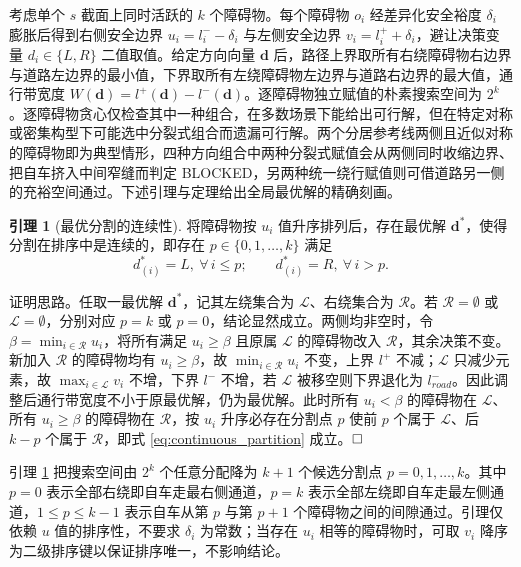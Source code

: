 \documentclass[a4paper,11pt]{ctexart}
\theoremstyle{definition}
\newtheorem{lemma}{引理}[section]
\begin{document}
考虑单个 $s$ 截面上同时活跃的 $k$ 个障碍物。每个障碍物 $o_i$ 经差异化安全裕度 $\delta_i$ 膨胀后得到右侧安全边界 $u_i = l_i^{-} - \delta_i$ 与左侧安全边界 $v_i = l_i^{+} + \delta_i$，避让决策变量 $d_i \in \{L, R\}$ 二值取值。给定方向向量 $\mathbf{d}$ 后，路径上界取所有右绕障碍物右边界与道路左边界的最小值，下界取所有左绕障碍物左边界与道路右边界的最大值，通行带宽度 $W(\mathbf{d}) = l^{+}(\mathbf{d}) - l^{-}(\mathbf{d})$。逐障碍物独立赋值的朴素搜索空间为 $2^k$。逐障碍物贪心仅检查其中一种组合，在多数场景下能给出可行解，但在特定对称或密集构型下可能选中分裂式组合而遗漏可行解。两个分居参考线两侧且近似对称的障碍物即为典型情形，四种方向组合中两种分裂式赋值会从两侧同时收缩边界、把自车挤入中间窄缝而判定 BLOCKED，另两种统一绕行赋值则可借道路另一侧的充裕空间通过。下述引理与定理给出全局最优解的精确刻画。

\begin{lemma}[最优分割的连续性]
\label{lem:continuous_partition}
将障碍物按 $u_i$ 值升序排列后，存在最优解 $\mathbf{d}^{*}$，使得分割在排序中是连续的，即存在 $p \in \{0, 1, \ldots, k\}$ 满足
\begin{equation}
    d_{(i)}^{*} = L,\ \forall\, i \leq p; \qquad d_{(i)}^{*} = R,\ \forall\, i > p.
    \label{eq:continuous_partition}
\end{equation}
\end{lemma}

证明思路。任取一最优解 $\mathbf{d}^{*}$，记其左绕集合为 $\mathcal{L}$、右绕集合为 $\mathcal{R}$。若 $\mathcal{R}=\emptyset$ 或 $\mathcal{L}=\emptyset$，分别对应 $p=k$ 或 $p=0$，结论显然成立。两侧均非空时，令 $\beta = \min_{i \in \mathcal{R}} u_i$，将所有满足 $u_i \geq \beta$ 且原属 $\mathcal{L}$ 的障碍物改入 $\mathcal{R}$，其余决策不变。新加入 $\mathcal{R}$ 的障碍物均有 $u_i \geq \beta$，故 $\min_{i \in \mathcal{R}} u_i$ 不变，上界 $l^{+}$ 不减；$\mathcal{L}$ 只减少元素，故 $\max_{i \in \mathcal{L}} v_i$ 不增，下界 $l^{-}$ 不增，若 $\mathcal{L}$ 被移空则下界退化为 $l_{road}^{-}$。因此调整后通行带宽度不小于原最优解，仍为最优解。此时所有 $u_i < \beta$ 的障碍物在 $\mathcal{L}$、所有 $u_i \geq \beta$ 的障碍物在 $\mathcal{R}$，按 $u_i$ 升序必存在分割点 $p$ 使前 $p$ 个属于 $\mathcal{L}$、后 $k-p$ 个属于 $\mathcal{R}$，即式 \eqref{eq:continuous_partition} 成立。$\hfill\Box$

引理 \ref{lem:continuous_partition} 把搜索空间由 $2^k$ 个任意分配降为 $k+1$ 个候选分割点 $p = 0, 1, \ldots, k$。其中 $p=0$ 表示全部右绕即自车走最右侧通道，$p=k$ 表示全部左绕即自车走最左侧通道，$1 \leq p \leq k-1$ 表示自车从第 $p$ 与第 $p+1$ 个障碍物之间的间隙通过。引理仅依赖 $u$ 值的排序性，不要求 $\delta_i$ 为常数；当存在 $u_i$ 相等的障碍物时，可取 $v_i$ 降序为二级排序键以保证排序唯一，不影响结论。
\end{document}
